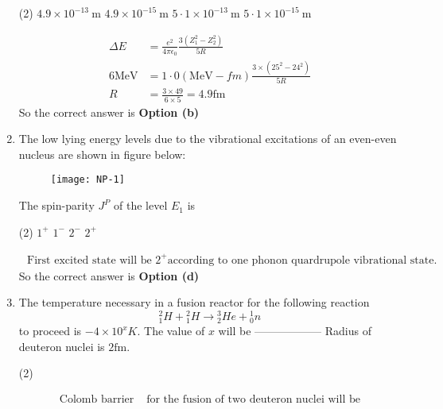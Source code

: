 \begin{enumerate}
  \begin{tasks}(2)
 	\task[\textbf{a.}] $4.9 \times 10^{-13} \mathrm{~m}$
 	\task[\textbf{b.}]$4.9 \times 10^{-15} \mathrm{~m}$
 	\task[\textbf{c.}]$5 \cdot 1 \times 10^{-13} \mathrm{~m}$
 	\task[\textbf{d.}] $5 \cdot 1 \times 10^{-15} \mathrm{~m}$	
 \end{tasks}
\begin{answer}
	$$
	\begin{aligned}
	\Delta E&=\frac{e^2}{4 \pi \epsilon_0} \frac{3\left(Z_1^2-Z_2^2\right)}{5 R}\\
	6 \mathrm{MeV}&=1 \cdot 0(\mathrm{MeV}-f m) \frac{3 \times\left(25^2-24^2\right)}{5 R}\\
	R&=\frac{3 \times 49}{6 \times 5}=4.9 \mathrm{fm}
\end{aligned}
$$
So the correct answer is \textbf{Option (b)}
\end{answer}
\item  The low lying energy levels due to the vibrational excitations of an even-even nucleus are shown in figure below:
\begin{figure}[H]
	\centering
	\texttt{[image: NP-1]}
\end{figure}
	The spin-parity $J^P$ of the level $E_1$ is
	 \begin{tasks}(2)
		\task[\textbf{a.}]$1^{+}$
		\task[\textbf{b.}] $1^{-}$
		\task[\textbf{c.}]$2^{-}$
		\task[\textbf{d.}]  $2^{+}$
	\end{tasks}
\begin{answer}
	$$
	\begin{aligned}
	\text { First excited state will be } 2^{+} \text {according to one phonon quardrupole vibrational state. }
\end{aligned}
$$
So the correct answer is \textbf{Option (d)}
\end{answer}
	\item The temperature necessary in a fusion reactor for the following reaction
$$
{ }_1^2 H+{ }_1^2 H \rightarrow{ }_2^3 H e+{ }_0^1 n
$$
to proceed is $-4 \times 10^x K$. The value of $x$ will be ------------------ Radius of deuteron nuclei is $2 \mathrm{fm}$.	
 \begin{tasks}(2)
\end{tasks}
\begin{answer}
	$$
	\begin{aligned}
	\text{Colomb barrier }&\text{for the fusion of two deuteron nuclei will be}\\

\end{aligned}$$
\end{answer}
\end{enumerate}

